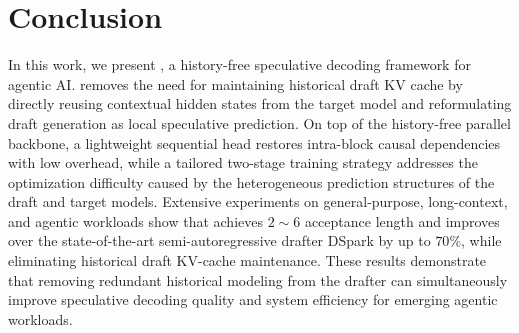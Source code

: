 \section{Conclusion}

In this work, we present \we, a history-free speculative decoding framework for agentic AI. \we removes the need for maintaining historical draft KV cache by directly reusing contextual hidden states from the target model and reformulating draft generation as local speculative prediction. On top of the history-free parallel backbone, a lightweight sequential head restores intra-block causal dependencies with low overhead, while a tailored two-stage training strategy addresses the optimization difficulty caused by the heterogeneous prediction structures of the draft and target models. Extensive experiments on general-purpose, long-context, and agentic workloads show that \we achieves \(2\sim6\) acceptance length and improves over the state-of-the-art semi-autoregressive drafter DSpark by up to \(70\%\), while eliminating historical draft KV-cache maintenance. These results demonstrate that removing redundant historical modeling from the drafter can simultaneously improve speculative decoding quality and system efficiency for emerging agentic workloads.